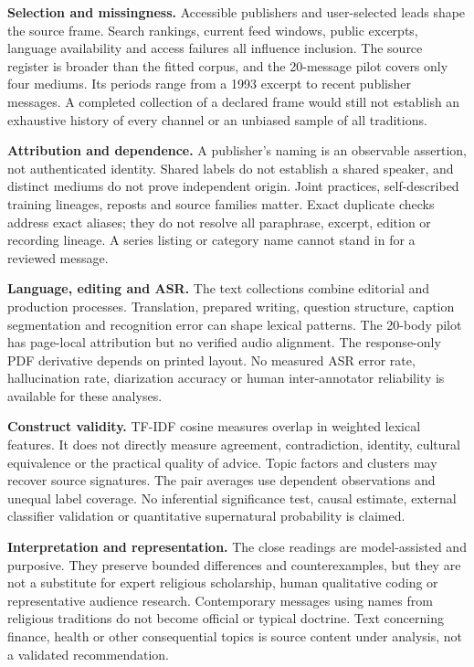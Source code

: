 \documentclass[
  11pt,
]{article}
\begin{document}
\textbf{Selection and missingness.} Accessible publishers and
user-selected leads shape the source frame. Search rankings, current
feed windows, public excerpts, language availability and access failures
all influence inclusion. The source register is broader than the fitted
corpus, and the 20-message pilot covers only four mediums. Its periods
range from a 1993 excerpt to recent publisher messages. A completed
collection of a declared frame would still not establish an exhaustive
history of every channel or an unbiased sample of all traditions.

\textbf{Attribution and dependence.} A publisher's naming is an
observable assertion, not authenticated identity. Shared labels do not
establish a shared speaker, and distinct mediums do not prove
independent origin. Joint practices, self-described training lineages,
reposts and source families matter. Exact duplicate checks address exact
aliases; they do not resolve all paraphrase, excerpt, edition or
recording lineage. A series listing or category name cannot stand in for
a reviewed message.

\textbf{Language, editing and ASR.} The text collections combine
editorial and production processes. Translation, prepared writing,
question structure, caption segmentation and recognition error can shape
lexical patterns. The 20-body pilot has page-local attribution but no
verified audio alignment. The response-only PDF derivative depends on
printed layout. No measured ASR error rate, hallucination rate,
diarization accuracy or human inter-annotator reliability is available
for these analyses.

\textbf{Construct validity.} TF-IDF cosine measures overlap in weighted
lexical features. It does not directly measure agreement, contradiction,
identity, cultural equivalence or the practical quality of advice. Topic
factors and clusters may recover source signatures. The pair averages
use dependent observations and unequal label coverage. No inferential
significance test, causal estimate, external classifier validation or
quantitative supernatural probability is claimed.

\textbf{Interpretation and representation.} The close readings are
model-assisted and purposive. They preserve bounded differences and
counterexamples, but they are not a substitute for expert religious
scholarship, human qualitative coding or representative audience
research. Contemporary messages using names from religious traditions do
not become official or typical doctrine. Text concerning finance, health
or other consequential topics is source content under analysis, not a
validated recommendation.
\end{document}

